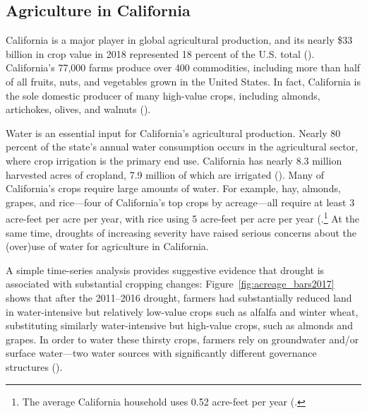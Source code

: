 %
%

\subsection{Agriculture in California}
California is a major player in global agricultural production, and its nearly \$33 billion in crop value in 2018 represented 18 percent of the U.S. total (\textcite{ers2020}). California's 77,000 farms produce over 400 commodities, including more than half of all fruits, nuts, and vegetables grown in the United States. In fact, California is the sole domestic producer of many high-value crops, including almonds, artichokes, olives, and walnuts (\textcite{cdfa2011}).  



Water is an essential input for California's agricultural production. Nearly 80 percent of the state's annual water consumption occurs in the agricultural sector, where crop irrigation is the primary end use. California has nearly 8.3 million harvested acres of cropland, 7.9 million of which are irrigated (\textcite{crs2015}). Many of California's crops require large amounts of water. For example, hay, almonds, grapes, and rice---four of California's top crops by acreage---all require at least 3 acre-feet per acre per year, with rice using 5 acre-feet per acre per year (\textcite{bruno2019}.\footnote{The average California household uses 0.52 acre-feet per year (\textcite{hanak2011}.} At the same time, droughts of increasing severity have raised serious concerns about the (over)use of water for agriculture in California.

A simple time-series analysis provides suggestive evidence that drought is associated with substantial cropping changes: Figure~\ref{fig:acreage_bars2017} shows that after the 2011--2016 drought, farmers had substantially reduced land in water-intensive but relatively low-value crops such as alfalfa and winter wheat, substituting similarly water-intensive but high-value crops, such as almonds and grapes. In order to water these thirsty crops, farmers rely on groundwater and/or surface water---two water sources with significantly different governance structures (\textcite{sawyers2007}).
